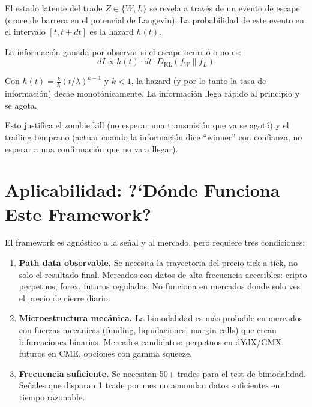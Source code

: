 \documentclass[11pt,a4paper]{article}
\begin{document}
\begin{tcolorbox}[math, title=Conexi\'on formal]
El estado latente del trade $Z \in \{W, L\}$ se revela a trav\'es de
un evento de escape (cruce de barrera en el potencial de Langevin).
La probabilidad de este evento en el intervalo $[t, t+dt]$ es la
hazard $h(t)$.

La informaci\'on ganada por observar si el escape ocurri\'o o no es:
\begin{equation}
dI \propto h(t) \cdot dt \cdot D_{\text{KL}}(f_W \| f_L)
\end{equation}

Con $h(t) = \frac{k}{\lambda}(t/\lambda)^{k-1}$ y $k < 1$, la hazard
(y por lo tanto la tasa de informaci\'on) decae monotónicamente.
La informaci\'on llega r\'apido al principio y se agota.

Esto justifica el zombie kill (no esperar una transmisi\'on que ya se
agot\'o) y el trailing temprano (actuar cuando la informaci\'on dice
``winner'' con confianza, no esperar a una confirmaci\'on que no va a
llegar).
\end{tcolorbox}


\section{Aplicabilidad: ?`D\'onde Funciona Este Framework?}
\label{sec:aplicabilidad}

El framework es agn\'ostico a la se\~nal y al mercado, pero requiere
tres condiciones:

\begin{enumerate}[leftmargin=2em]
\item \textbf{Path data observable.} Se necesita la trayectoria del
  precio tick a tick, no solo el resultado final. Mercados con datos
  de alta frecuencia accesibles: cripto perpetuos, forex, futuros
  regulados. No funciona en mercados donde solo ves el precio de
  cierre diario.

\item \textbf{Microestructura mec\'anica.} La bimodalidad es m\'as
  probable en mercados con fuerzas mec\'anicas (funding, liquidaciones,
  margin calls) que crean bifurcaciones binarias. Mercados candidatos:
  perpetuos en dYdX/GMX, futuros en CME, opciones con gamma squeeze.

\item \textbf{Frecuencia suficiente.} Se necesitan 50+ trades para
  el test de bimodalidad. Se\~nales que disparan 1 trade por mes no
  acumulan datos suficientes en tiempo razonable.
\end{enumerate}
\end{document}
